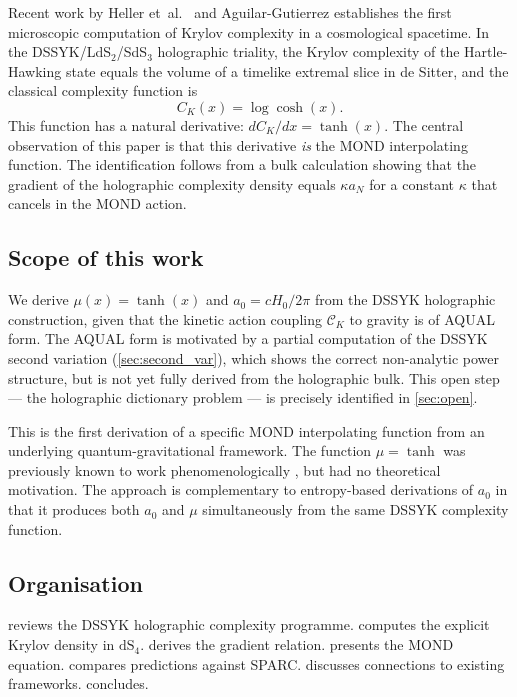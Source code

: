 \documentclass[a4paper,11pt]{article}
\newcommand{\CK}{\mathcal{C}_K}                     %
\newcommand{\kap}{\kappa}                            %
\newcommand{\az}{a_0}                                %
\newcommand{\aN}{a_N}                                %
\newcommand{\dS}[1]{\mathrm{dS}_{#1}}               %
\begin{document}
Recent work by Heller et~al.\ \cite{Heller:2025} and Aguilar-Gutierrez
\cite{Aguilar:2024} establishes the first microscopic computation of
Krylov complexity in a cosmological spacetime.  In the
DSSYK/LdS$_2$/SdS$_3$ holographic triality, the Krylov complexity of the
Hartle-Hawking state equals the volume of a timelike extremal slice in de
Sitter, and the classical complexity function is
\begin{equation}
  C_K(x) = \log\cosh(x).
  \label{eq:CK}
\end{equation}
This function has a natural derivative: $dC_K/dx = \tanh(x)$.  The
central observation of this paper is that this derivative \emph{is} the
MOND interpolating function.  The identification follows from a bulk
calculation showing that the gradient of the holographic complexity
density equals $\kap\aN$ for a constant $\kap$ that cancels in the MOND
action.

\subsection{Scope of this work}
\label{sec:scope}

We derive $\mu(x)=\tanh(x)$ and $\az=cH_0/2\pi$ from the DSSYK
holographic construction, given that the kinetic action coupling $\CK$ to
gravity is of AQUAL form.  The AQUAL form is motivated by a partial
computation of the DSSYK second variation (\cref{sec:second_var}), which
shows the correct non-analytic power structure, but is not yet fully
derived from the holographic bulk.  This open step --- the holographic
dictionary problem --- is precisely identified in \cref{sec:open}.

This is the first derivation of a specific MOND interpolating function
from an underlying quantum-gravitational framework.  The function
$\mu=\tanh$ was previously known to work phenomenologically
\cite{Zhao:2006}, but had no theoretical motivation.  The approach is
complementary to entropy-based derivations of $\az$
\cite{Milgrom:2023,Zhao:2010,Verlinde:2017} in that it produces both $\az$
and $\mu$ simultaneously from the same DSSYK complexity function.

\subsection{Organisation}

 reviews the DSSYK holographic complexity programme.
 computes the explicit Krylov density in $\dS{4}$.
 derives the gradient relation.
 presents the MOND equation.
 compares predictions against SPARC.
 discusses connections to existing frameworks.
 concludes.
\end{document}
